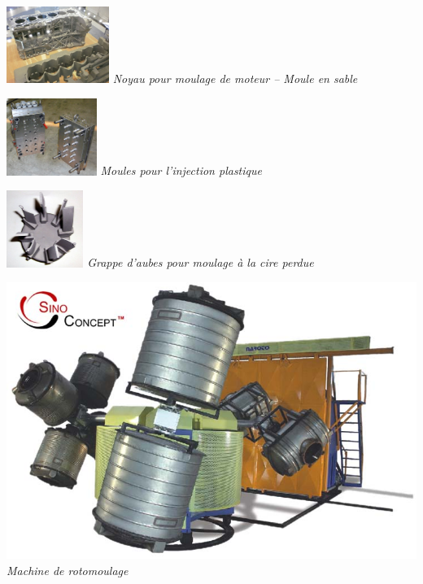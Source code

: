 \documentclass[11pt,oneside]{article}
\begin{document}
\begin{minipage}[c]{.2\linewidth}
\begin{center}
\includegraphics[height=2.5cm]{png/moteur}
\textit{Noyau pour moulage de moteur -- Moule en sable \cite{moteur}}
\end{center}
\end{minipage} \hfill
\begin{minipage}[c]{.2\linewidth}
\begin{center}
\includegraphics[height=2.5cm]{png/injection2}
\textit{Moules pour l'injection plastique \cite{injection}}
\end{center}
\end{minipage} \hfill
\begin{minipage}[c]{.2\linewidth}
\begin{center}
\includegraphics[height=2.5cm]{png/cireperdue}
\textit{Grappe d'aubes pour moulage à la cire perdue \cite{cireperdue}}
\end{center}
\end{minipage} \hfill
\begin{minipage}[c]{.2\linewidth}
\begin{center}
\includegraphics[width=.9\textwidth]{png/rotomoulage.png}
\textit{Machine de rotomoulage \cite{rotomoulage}}
\end{center}
\end{minipage}
\end{document}
